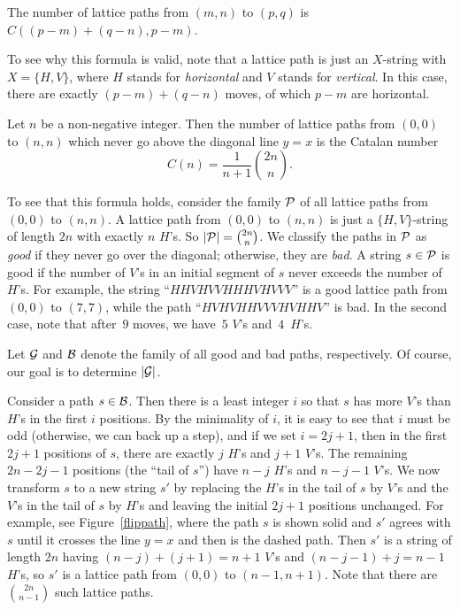 \begin{example}  The number of lattice paths from $(m,n)$ to
$(p,q)$ is $C((p-m)+(q-n),p-m)$.

To see why this formula is valid, note that a lattice 
path is just an $X$-string with
$X=\{H,V\}$, where $H$ stands for \textit{horizontal} and $V$ stands
for \textit{vertical}.  In this case, there are exactly $(p-m)+(q-n)$
moves, of which $p-m$ are horizontal.
\end{example}

\begin{example}

Let $n$ be a non-negative integer.  Then the number of lattice
paths from $(0,0)$ to $(n,n)$ which never go above the diagonal
line $y=x$ is the Catalan number 
\[
C(n) =\frac{1}{n+1}\binom{2n}{n}.
\]

To see that this formula holds, consider the family $\mathcal{P}$ of all
lattice paths from $(0,0)$ to $(n,n)$.  A lattice path from $(0,0)$ to
$(n,n)$ is just a $\{H,V\}$-string of length $2n$ with exactly $n$
$H$'s.  So $|\mathcal{P}|=\binom{2n}{n}$.  We classify the paths in $\mathcal{P}$ as
\textit{good} if they never go over the diagonal; otherwise, they are
\textit{bad}.  A string $s\in\mathcal{P}$ is good if the number of $V$'s in
an initial segment of $s$ never exceeds the number of $H$'s.  For
example, the string ``$HHVHVVHHHVHVVV$'' is a good lattice path from
$(0,0)$ to $(7,7)$, while the path ``$HVHVHHVVVHVHHV$'' is bad.  In
the second case, note that after~$9$ moves, we have~$5$ $V$'s
and~$4$~$H$'s.

Let $\mathcal{G}$ and $\mathcal{B}$ denote the family of all good and bad paths,
respectively.  Of course, our goal is to determine $|\mathcal{G}|$.

Consider a path $s\in\mathcal{B}$. Then there is a least integer $i$ so that
$s$ has more $V$'s than $H$'s in the first $i$ positions. By the
minimality of $i$, it is easy to see that $i$ must be odd (otherwise,
we can back up a step), and if we set $i=2j+1$, then in the first
$2j+1$ positions of $s$, there are exactly $j$ $H$'s and $j+1$
$V$'s. The remaining $2n-2j-1$ positions (the ``tail of $s$'') have
$n-j$ $H$'s and $n-j-1$ $V$'s. We now transform $s$ to a new string
$s'$ by replacing the $H$'s in the tail of $s$ by $V$'s and the $V$'s
in the tail of $s$ by $H$'s and leaving the initial $2j+1$ positions
unchanged. For example, see Figure~\ref{flippath}, where the path $s$
is shown solid and $s'$ agrees with $s$ until it crosses the line
$y=x$ and then is the dashed path. Then $s'$ is a string of length
$2n$ having $(n-j)+(j+1) = n+1$ $V$'s and $(n-j-1)+j=n-1$ $H$'s, so
$s'$ is a lattice path from $(0,0)$ to $(n-1,n+1)$. Note that there
are $\binom{2n}{n-1}$ such lattice paths.


\end{example}
